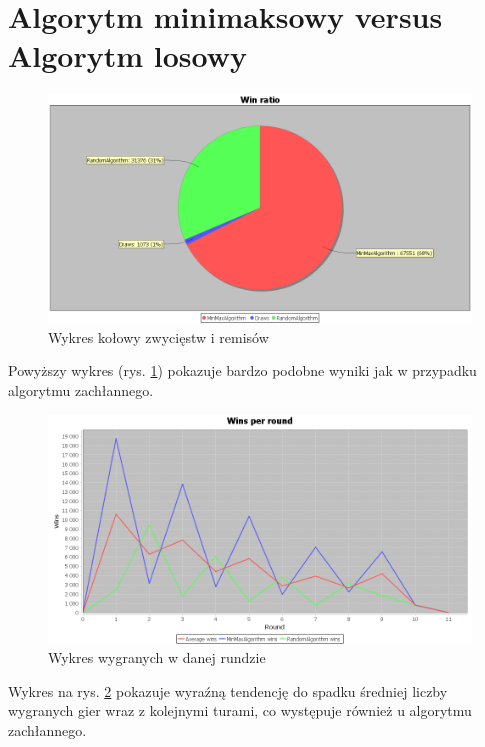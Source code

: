 \section{Algorytm minimaksowy versus Algorytm losowy}

\begin{figure}[H]
	\centering
	\includegraphics[width=\textwidth]{Resources/MmVsR/MmVsRwin.PNG}
	\caption{Wykres kołowy zwycięstw i remisów} 
	\label{fig:MmVsRwin}
\end{figure}

Powyższy wykres (rys. \ref{fig:MmVsRwin}) pokazuje bardzo podobne wyniki jak w przypadku algorytmu zachłannego.

\begin{figure}[H]
	\centering
	\includegraphics[width=\textwidth]{Resources/MmVsR/MmVsRroundwin.PNG}
	\caption{Wykres wygranych w danej rundzie} 
	\label{fig:MmVsRroundwin}
\end{figure}

Wykres na rys. \ref{fig:MmVsRroundwin} pokazuje wyraźną tendencję do spadku średniej liczby wygranych gier wraz z kolejnymi turami, co występuje również u algorytmu zachłannego.

